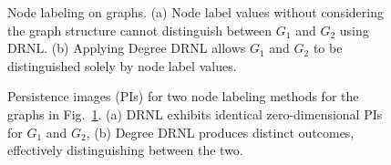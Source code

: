 \begin{figure}[!h]
\centering
\captionsetup[subfloat]{font=small}
\hfil
{}
\caption{Node labeling on graphs. (a) Node label values without considering the graph structure cannot distinguish between $G_1$ and $G_2$ using DRNL. (b) Applying Degree DRNL allows $G_1$ and $G_2$ to be distinguished solely by node label values.
}
\label{nodelabel}
\end{figure}

\begin{figure}[!h]
\centering
\captionsetup[subfloat]{font=small}
\hfil
{}
\caption{Persistence images (PIs) for two node labeling methods for the graphs in Fig.~\ref{nodelabel}.
(a) DRNL exhibits identical zero-dimensional PIs for $G_1$ and $G_2$, (b) Degree DRNL produces distinct outcomes, effectively distinguishing between the two.
}
\label{PD_nodelabel}
\end{figure}

